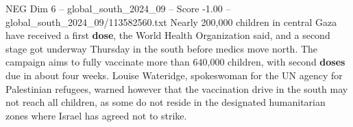 \begin{textsample}{NEG Dim 6 – global\_south\_2024\_09 – Score -1.00 – global\_south\_2024\_09/113582560.txt}
Nearly 200,000 children in central Gaza have received a first \textbf{dose}, the World Health Organization said, and a second stage got underway Thursday in the south before medics move north.
The campaign aims to fully vaccinate more than 640,000 children, with second \textbf{doses} due in about four weeks.
Louise Wateridge, spokeswoman for the UN agency for Palestinian refugees, warned however that the vaccination drive in the south may not reach all children, as some do not reside in the designated humanitarian zones where Israel has agreed not to strike.

\end{textsample}
